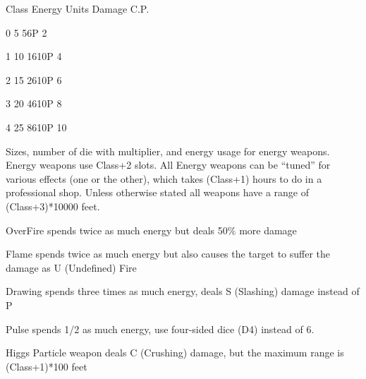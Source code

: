 \documentclass[twoside]{book}
\begin{document}
                  
                   Class   
                   Energy Units   
                   Damage 
                   C.P.   
                  
                  
                   0 
                   5   
                   56P 
                   2   
                  
                  
                   1 
                   10   
                   1610P 
                   4   
                  
                  
                   2 
                   15   
                   2610P 
                   6   
                  
                  
                   3 
                   20   
                   4610P 
                   8   
                  
                  
                   4 
                   25   
                   8610P 
                   10   
                  
                
                Sizes, number of die with multiplier, and
                 energy usage for energy weapons.
              Energy weapons use Class+2 slots.   All Energy weapons can be “tuned” for
               various effects (one or the other), which takes (Class+1)
               hours to do in a professional shop. Unless otherwise
               stated all weapons have a range of (Class+3)*10000 feet.
                 
              
                 OverFire   
                  spends twice as much energy but deals 50\% more
                 damage 
                
              
                 Flame   
                  spends twice as much energy but also causes the
                 target to suffer the damage as U (Undefined) Fire
                 
                
              
                 Drawing   
                  spends three times as much energy, deals S
                 (Slashing) damage instead of P 
                
              
                 Pulse   
                  spends 1/2 as much energy, use four-sided dice
                 (D4) instead of 6. 
                
              
                 Higgs Particle   
                  weapon deals C (Crushing) damage, but the maximum
                 range is (Class+1)*100 feet 
                
\end{document}
